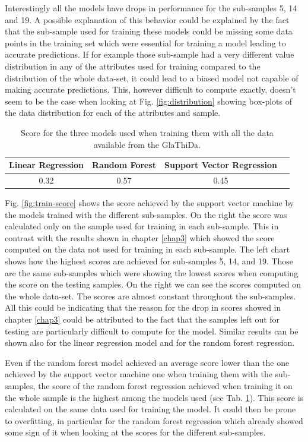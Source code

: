 Interestingly all the models have drops in performance for the sub-samples  5, 14 and 19. A possible explanation of this behavior could be explained by the fact that the sub-sample used for training these models could be missing some data points in the training set which were essential for training a model leading to accurate predictions. If for example those sub-sample had a very different value distribution in any of the attributes used for training compared to the distribution of the whole data-set, it could lead to a biased model not capable of making accurate predictions. This, however difficult to compute exactly, doesn't seem to be the case when looking at Fig. \ref{fig:distribution} showing box-plots of the data distribution for each of the attributes and sample.

\begin{table}[!b]
	\centering
	\caption{Score for the three models used when training them with all the data available from the GlaThiDa.}
	\begin{tabular}{|c|c|c|c|}
		\hline 
		Linear Regression&Random Forest&Support Vector Regression \\
		\hline
		0.32&0.57&0.45 \\
		\hline
	\end{tabular}
	\label{tb:all-score}
\end{table}

Fig. \ref{fig:train-score} shows the score achieved by the support vector machine by the models trained with the different sub-samples. On the right the score was calculated only on the sample used for training in each sub-sample. This in contrast with the results shown in chapter \ref{chap3} which showed the score computed on the data not used for training in each sub-sample. The left chart shows how the highest scores are achieved for sub-samples 5, 14, and 19. Those are the same sub-samples which were showing the lowest scores when computing the score on the testing samples. On the right we can see the scores computed on the whole data-set. The scores are almost constant throughout the sub-samples. All this could be indicating that the reason for the drop in scores showed in chapter \ref{chap3} could be attributed to the fact that the samples left out for testing are particularly difficult to compute for the model. Similar results can be shown also for the linear regression model and for the random forest regression.

Even if the random forest model achieved an average score lower than the one achieved by the support vector machine one when training them with the sub-samples, the score of the random forest regression achieved when training it on the whole sample is the highest among the models used (see Tab. \ref{tb:all-score}). This score is calculated on the same data used for training the model. It could then be prone to overfitting, in particular for the random forest regression which already showed some sign of it when looking at the scores for the different sub-samples.

